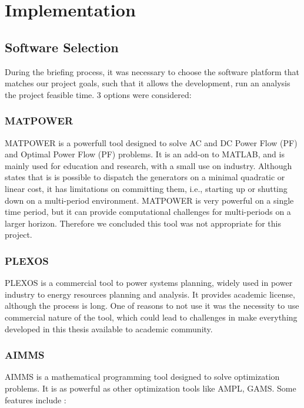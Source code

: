 \documentclass[12pt,LUDisStyle,twosided]{book}
\begin{document}
\section{Implementation}


\subsection{Software Selection}

During the briefing process, it was necessary to choose the software platform that matches our project goals, such that it allows the development, run an analysis the project feasible time. 3 options were considered:

\subsubsection{MATPOWER}

MATPOWER is a powerfull tool designed to solve AC and DC Power Flow (PF) and Optimal Power Flow (PF) problems. It is an add-on to MATLAB, and is mainly used for education and research, with a small use on industry. \cite{zimmerman} Although \citeauthor{zimmerman} states that is is possible to dispatch the generators on a minimal quadratic or linear cost, it has limitations on committing them, i.e., starting up or shutting down on a multi-period environment. MATPOWER is very powerful on a single time period, but it can provide computational challenges for multi-periods on a larger horizon. Therefore we concluded this tool was not appropriate for this project.

\subsubsection{PLEXOS \textregistered }

PLEXOS \textregistered is a commercial tool to power systems planning, widely used in power industry to energy resources planning and analysis. It provides academic license, although the process is long. One of reasons to not use it was the necessity to use commercial nature of the tool, which could lead to challenges in make everything developed in this thesis available to academic community.  

\subsubsection{AIMMS}


AIMMS is a mathematical programming tool designed to solve optimization problems. It is as powerful as other optimization tools like AMPL, GAMS. Some features include \cite{bisschop}:
\end{document}

